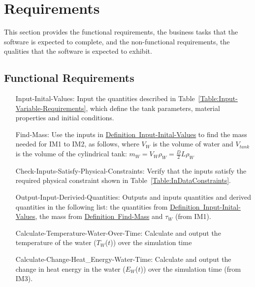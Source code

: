 \documentclass[12pt]{article}
\begin{document}
\section{Requirements}
\label{Sec:Requirements}
This section provides the functional requirements, the business tasks that the software is expected to complete, and the non-functional requirements, the qualities that the software is expected to exhibit.
\subsection{Functional Requirements}
\label{Sec:FRs}
\begin{itemize}
\item[Input-Inital-Values:\label{Input-Inital-Values}]Input the quantities described in Table~\ref{Table:Input-Variable-Requirements}, which define the tank parameters, material properties and initial conditions.
\item[Find-Mass:\label{Find-Mass}]Use the inputs in \hyperref[Input-Inital-Values]{Definition~Input-Inital-Values} to find the mass needed for IM1 to IM2, as follows, where ${V_{W}}$ is the volume of water and ${V_{tank}}$ is the volume of the cylindrical tank: ${m_{W}}={V_{W}} {ρ_{W}}=\frac{D}{2} L {ρ_{W}}$
\item[Check-Inputs-Satisfy-Physical-Constraints:\label{Check-Inputs-Satisfy-Physical-Constraints}]Verify that the inputs satisfy the required physical constraint shown in Table~\ref{Table:InDataConstraints}.
\item[Output-Input-Derivied-Quantities:\label{Output-Input-Derivied-Quantities}]Outputs and inputs quantities and derived quantities in the following list: the quantities from \hyperref[Input-Inital-Values]{Definition~Input-Inital-Values}, the mass from \hyperref[Find-Mass]{Definition~Find-Mass} and ${τ_{W}}$ (from IM1).
\item[Calculate-Temperature-Water-Over-Time:\label{Calculate-Temperature-Water-Over-Time}]Calculate and output the temperature of the water (${T_{W}}$($t$)) over the simulation time
\item[Calculate-Change-Heat\_Energy-Water-Time:\label{Calculate-Change-Heat\_Energy-Water-Time}]Calculate and output the change in heat energy in the water (${E_{W}}$($t$)) over the simulation time (from IM3).
\end{itemize}
\end{document}
